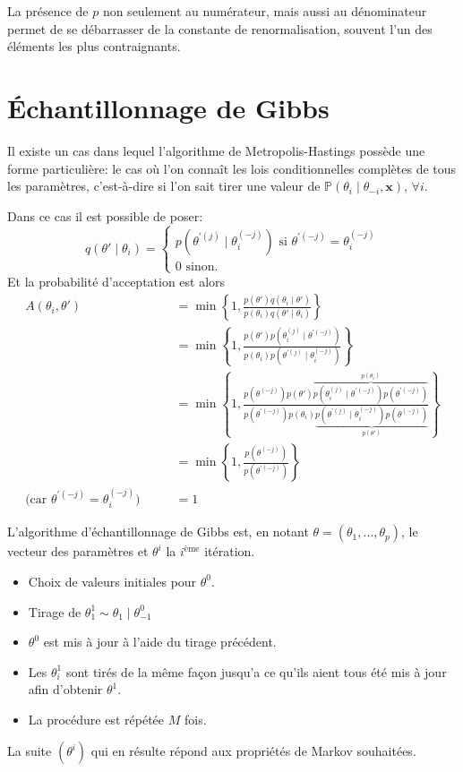 La présence de $p$ non seulement au numérateur, mais aussi au dénominateur permet de se débarrasser de la constante de renormalisation, souvent l'un des éléments les plus contraignants.

\section{Échantillonnage de Gibbs}\label{gibbs}

Il existe un cas dans lequel l'algorithme de Metropolis-Hastings possède une forme particulière: le cas où l'on connaît les lois conditionnelles complètes de tous les paramètres, c'est-à-dire si l'on sait tirer une valeur de $\mathbb{P} (\theta_i \mid \theta_{-i} , \mathbf{x})$, $\forall i$.

Dans ce cas il est possible de poser:
\begin{equation*}
    q ( \theta' \mid \theta_i ) = \begin{cases}
        p( \theta^{'(j)} \mid \theta_{i}^{(-j)} ) \text{ si } \theta^{'(-j)} = \theta_i^{(-j)} \\
        0 \text{ sinon.}
    \end{cases}
\end{equation*}
Et la probabilité d'acceptation est alors
\begin{align*}
    A( \theta_i , \theta' ) &= \min \left\{ 1 , \frac{p(\theta') q ( \theta_i \mid \theta' )}{p(\theta_i) q ( \theta' \mid \theta_i )} \right\} \\
    &= \min \left\{ 1 , \frac{p(\theta') p(\theta_{i}^{(j)} \mid \theta^{'(-j)})}{p(\theta_i) p( \theta^{'(j)} \mid \theta_{i}^{(-j)} )} \right\} \\
    &= \min \left\{ 1 , \frac{p(\theta^{(-j)}) p(\theta') \overbrace{p(\theta_{i}^{(j)} \mid \theta^{'(-j)}) p ( \theta^{'(-j)} )}^{ p( \theta_i ) } }{ p(\theta^{'(-j)}) p(\theta_i) \underbrace{p( \theta^{'(j)} \mid \theta_{i}^{(-j)} ) p(\theta^{(-j)})}_{ p(\theta' )}} \right\} \\
    &= \min \left\{ 1 , \frac{p(\theta^{(-j)}) }{ p(\theta^{'(-j)}) } \right\} \\
    \text{(car } \theta^{'(-j)} = \theta_i^{(-j)} \text{)} \qquad  &= 1
\end{align*}

L'algorithme d'échantillonnage de Gibbs est, en notant $\theta = ( \theta_1 , \dotsc , \theta_p )$, le vecteur des paramètres et $\theta^i$ la $i^\text{ème}$ itération.
\begin{itemize}
    \item Choix de valeurs initiales pour $\theta^0$.
    \item Tirage de $\theta^1_1 \sim \theta_1 \mid \theta^0_{-1}$
    \item $\theta^0$ est mis à jour à l'aide du tirage précédent.
    \item Les $\theta^1_i$ sont tirés de la même façon jusqu'a ce qu'ils aient tous été mis à jour afin d'obtenir $\theta^1$.
    \item La procédure est répétée $M$ fois.
\end{itemize}

La suite $\left( \theta^i \right)$ qui en résulte répond aux propriétés de Markov souhaitées.


